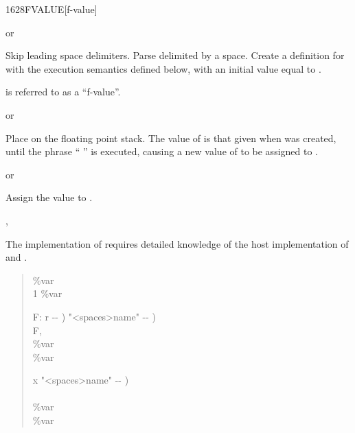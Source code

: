 \enlargethispage{6ex}
\begin{worddef}{1628}{FVALUE}[f-value]
\item {}  or

	Skip leading space delimiters.  Parse  delimited by a
	space.  Create a definition for  with the execution
	semantics defined below, with an initial value equal to .

	 is referred to as a ``f-value''.

\execute[name]
	 or 

	Place  on the floating point stack.  The value of
	 is that given when  was created, until the
	phrase ``  '' is executed, causing
	a new value of  to be assigned to .

	 or 

	Assign the value  to .

\see {}, 

	\begin{implement}
		\dffamily
		The implementation of  requires detailed
		knowledge of the host implementation of  and
		.

		\begin{quote}\ttfamily
			 \%var \\
			\word{:}  1 \%var \word{!} \word{;}

			\word{:}   F: r -{}- )  "<spaces>name" -{}- ) \\
			\tab {} F, \\
			\tab {} \%var       \\
			 \%var \word{!} \word{;}

			\word{:}   x "<spaces>name" -{}- ) \\
			\tab {} \word{,} \\
			\tab {} \%var   ~\word{!}  ~  \\
			 \%var \word{!} \word{;}
		\end{quote}
	\end{implement}


\end{worddef}
